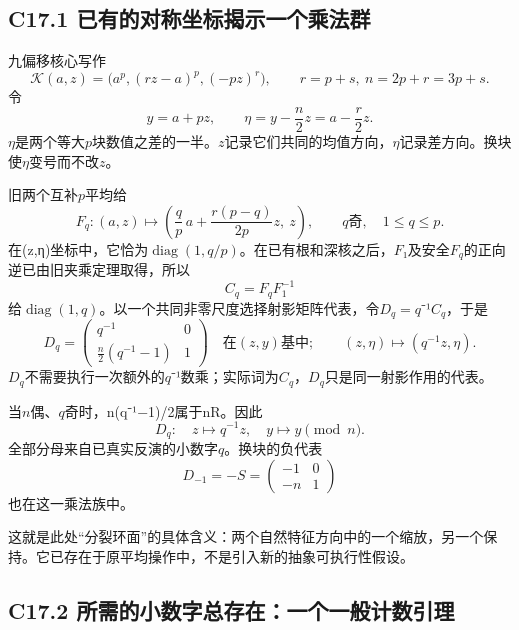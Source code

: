 \documentclass[11pt,a4paper]{article}
\theoremstyle{definition}
\numberwithin{equation}{section}
\begin{document}
\subsection*{\texorpdfstring{{C17.1} {已有的对称坐标揭示一个乘法群}}{C17.1 已有的对称坐标揭示一个乘法群}}\label{C17-h123}

{九偏移核心写作} \[
\mathcal K(a,z)=
\bigl(a^p,(rz-a)^p,(-pz)^r\bigr),
\qquad r=p+s,\ n=2p+r=3p+s.
\] {令} \[
y=a+pz,\qquad \eta=y-\frac n2z=a-\frac r2z.
\tag{C17.1.1}
\] {\ensuremath{\eta }是两个等大\ensuremath{p}块数值之差的一半。\ensuremath{z}记录它们共同的均值方向，\ensuremath{\eta }记录差方向。换块使\ensuremath{\eta }变号而不改\ensuremath{z}。}

{旧两个互补\ensuremath{p}平均给} \[
F_q:
(a,z)\longmapsto
\left(\frac qp\,a+\frac{r(p-q)}{2p}z,\ z\right),
\qquad q\text{奇},\quad1\le q\le p.
\] {在(z,η)坐标中，它恰为\ensuremath{\operatorname{diag}(1,q/p)}。在已有根和深核之后，\ensuremath{F}₁及安全\ensuremath{F_{q}}的正向逆已由旧夹乘定理取得，所以} \[
C_q=F_qF_1^{-1}
\] {给\ensuremath{\operatorname{diag}(1,q)}。以一个共同非零尺度选择射影矩阵代表，令\ensuremath{D_{q}=q}⁻¹\ensuremath{C_{q}}，于是} \[
\boxed{
D_q=\begin{pmatrix}
q^{-1}&0\\
\frac n2(q^{-1}-1)&1
\end{pmatrix}
\quad\text{在}(z,y)\text{基中};
\qquad
(z,\eta)\mapsto(q^{-1}z,\eta).
}
\tag{C17.1.2}
\] {\ensuremath{D_{q}}不需要执行一次额外的\ensuremath{q}⁻¹数乘；实际词为\ensuremath{C_{q}}，\ensuremath{D_{q}}只是同一射影作用的代表。}

{当\ensuremath{n}偶、\ensuremath{q}奇时，n(q⁻¹−1)/2属于nR。因此} \[
\boxed{D_q:\quad z\mapsto q^{-1}z,\quad y\mapsto y\pmod n.}
\tag{C17.1.3}
\] {全部分母来自已真实反演的小数字\ensuremath{q}。换块的负代表} \[
D_{-1}=-S=\begin{pmatrix}-1&0\\-n&1\end{pmatrix}
\] {也在这一乘法族中。}

{这就是此处``分裂环面''的具体含义：两个自然特征方向中的一个缩放，另一个保持。它已存在于原平均操作中，不是引入新的抽象可执行性假设。}

\subsection*{\texorpdfstring{{C17.2} {所需的小数字总存在：一个一般计数引理}}{C17.2 所需的小数字总存在：一个一般计数引理}}\label{C17-h124}
\end{document}
